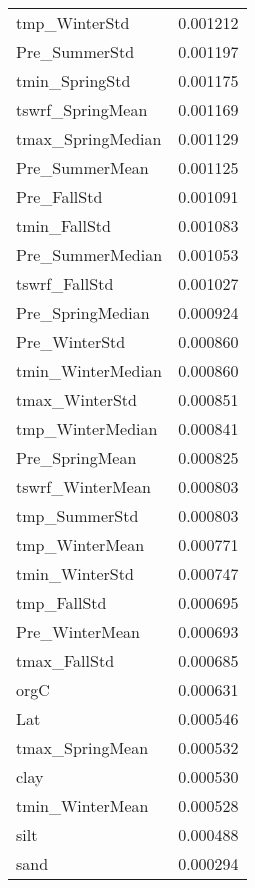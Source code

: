 \begin{tabular}{lr}
tmp_WinterStd & 0.001212 \\
Pre_SummerStd & 0.001197 \\
tmin_SpringStd & 0.001175 \\
tswrf_SpringMean & 0.001169 \\
tmax_SpringMedian & 0.001129 \\
Pre_SummerMean & 0.001125 \\
Pre_FallStd & 0.001091 \\
tmin_FallStd & 0.001083 \\
Pre_SummerMedian & 0.001053 \\
tswrf_FallStd & 0.001027 \\
Pre_SpringMedian & 0.000924 \\
Pre_WinterStd & 0.000860 \\
tmin_WinterMedian & 0.000860 \\
tmax_WinterStd & 0.000851 \\
tmp_WinterMedian & 0.000841 \\
Pre_SpringMean & 0.000825 \\
tswrf_WinterMean & 0.000803 \\
tmp_SummerStd & 0.000803 \\
tmp_WinterMean & 0.000771 \\
tmin_WinterStd & 0.000747 \\
tmp_FallStd & 0.000695 \\
Pre_WinterMean & 0.000693 \\
tmax_FallStd & 0.000685 \\
orgC & 0.000631 \\
Lat & 0.000546 \\
tmax_SpringMean & 0.000532 \\
clay & 0.000530 \\
tmin_WinterMean & 0.000528 \\
silt & 0.000488 \\
sand & 0.000294 \\
\bottomrule
\end{tabular}
